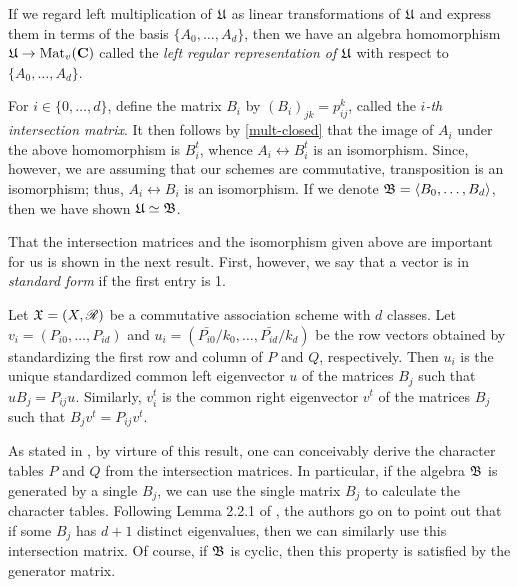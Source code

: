 \documentclass[../../../main]{subfiles}
\begin{document}
 If we regard left multiplication of $\mathfrak{U}$ as linear transformations of $\mathfrak{U}$ and
 express them in terms of the basis $\{A_0, \dots, A_d\}$, then we have an
 algebra homomorphism $\mathfrak{U} \rightarrow \text{Mat}_v(\mathbf{C})$ called the {\it left regular
   representation of $\mathfrak{U}$} with respect to $\{A_0, \dots, A_d\}$.  
 
 For $i \in \{0, \dots, d\}$, define the matrix $B_i$ by $(B_i)_{jk}=p_{ij}^k$,
 called the {\it $i$-th intersection matrix}. It then
 follows by \ref{mult-closed} that the image of $A_i$ under the above
 homomorphism is $B_i^t$, whence $A_i \leftrightarrow B_i^t$ is an isomorphism.
 Since, however, we are assuming that our schemes are commutative, transposition
 is an isomorphism; thus, $A_i \leftrightarrow B_i$ is an isomorphism. If we
 denote $\mathfrak{B}=\langle B_0, \dots, B_d\rangle$, then we have shown $\mathfrak{U}\simeq\mathfrak{B}$. 
 
 That the intersection matrices and the isomorphism given above are important
 for us is shown in the next result. First, however, we say that a vector is in
 {\it standard form} if the first entry is 1. 
 
 \begin{thm}\label{intersect-thm}
 Let $\mathfrak{X}=(X,\mathscr{R})$ be a commutative association scheme with $d$ classes. Let
 $v_i=(P_{i0},\dots,P_{id})$ and $u_i=(\bar{P_{i0}}/k_0, \dots,
 \bar{P_{id}}/k_d)$ be the row vectors obtained by standardizing the first row
 and column of $P$ and $Q$, respectively. Then $u_i$ is the unique standardized
 common left eigenvector $u$ of the matrices $B_j$ such that $uB_j=P_{ij}u$.
 Similarly, $v_i^t$ is the common right eigenvector $v^t$ of the matrices $B_j$
 such that $B_jv^t=P_{ij}v^t$. 
 \end{thm}

 As stated in \cite{bannaialgebraic}, by virture of this result, one can
 conceivably derive the character tables $P$ and $Q$ from the intersection
 matrices. In particular, if the algebra $\mathfrak{B}$ is generated by a single $B_j$,
 we can use the single matrix $B_j$ to calculate the character tables. Following
 Lemma 2.2.1 of \cite{distance-regular-graphs}, the authors go on to point out
 that if some $B_j$ has $d+1$ distinct eigenvalues, then we can similarly use
 this intersection matrix. Of course, if $\mathfrak{B}$ is cyclic, then this property is
 satisfied by the generator matrix. 

\biblio
\end{document}
